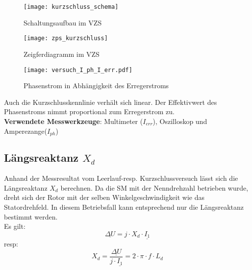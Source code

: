 \begin{flushleft}
\vspace{1cm}
 
 
\begin{figure}[H]
    \centering
        \texttt{[image: kurzschluss\_schema]}
    \caption{Schaltungsaufbau im VZS}
    \label{fig:abb1}
\end{figure}



\begin{figure}[H]
    \centering
        \texttt{[image: zps\_kurzschluss]}
    \caption{Zeigferdiagramm im VZS}
    \label{fig:abb1}
\end{figure}


\begin{figure}[H]
    \centering
        \texttt{[image: versuch\_I\_ph\_I\_err.pdf]}
    \caption{Phasenstrom in Abhängigkeit des Erregerstroms}
    \label{fig:abb1}
\end{figure}

Auch die Kurzschlusskennlinie verhält sich linear. Der Effektivwert des Phasenstroms nimmt proportional zum Erregerstrom zu.\\

\vspace{0.4cm}
\textbf{Verwendete Messwerkzeuge}: Multimeter ($I_{err}$), Oszilloskop und Amperezange($I_{ph}$) 




\newpage
\subsection{Längsreaktanz $X_d$}

Anhand der Messresultat vom Leerlauf-resp. Kurzschlussversuch lässt sich die Längsreaktanz $X_d$ berechnen. Da die SM mit der Nenndrehzahl betrieben wurde, dreht sich der Rotor mit der selben Winkelgeschwindigkeit wie das Statordrehfeld. In diesem Betriebsfall kann entsprechend nur die Längsreaktanz bestimmt werden.\\

Es gilt:\\

\vspace{0.3cm}
$$\underline{\Delta U} = j \cdot X_d \cdot \underline{I_1}$$
resp:\\
\vspace{0.3cm}
$$ X_d = \frac{\underline{\Delta U}}{j \cdot \underline{I_1}}  = 2 \cdot \pi \cdot f \cdot L_d$$\\


\end{flushleft}
